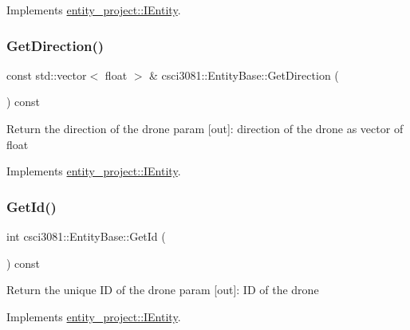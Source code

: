 Implements \hyperlink{classentity__project_1_1IEntity_a73c5b6deac9e2659160d2952ae7572c4}{entity\+\_\+project\+::\+I\+Entity}.

\mbox{\label{classcsci3081_1_1EntityBase_aeffff43e1d9b696b0ea3de83f7bee37d}} 
\subsubsection{\texorpdfstring{Get\+Direction()}{GetDirection()}}
{\footnotesize\ttfamily const std\+::vector$<$ float $>$ \& csci3081\+::\+Entity\+Base\+::\+Get\+Direction (\begin{DoxyParamCaption}{ }\end{DoxyParamCaption}) const\hspace{0.3cm}{\ttfamily [virtual]}}

Return the direction of the drone param \mbox{[}out\mbox{]}\+: direction of the drone as vector of float 

Implements \hyperlink{classentity__project_1_1IEntity_a385dad034b5a86666df9fc979a3d1d1b}{entity\+\_\+project\+::\+I\+Entity}.

\mbox{\label{classcsci3081_1_1EntityBase_a2802163d8d20092d985e763ad91d26da}} 
\subsubsection{\texorpdfstring{Get\+Id()}{GetId()}}
{\footnotesize\ttfamily int csci3081\+::\+Entity\+Base\+::\+Get\+Id (\begin{DoxyParamCaption}{ }\end{DoxyParamCaption}) const\hspace{0.3cm}{\ttfamily [virtual]}}

Return the unique ID of the drone param \mbox{[}out\mbox{]}\+: ID of the drone 

Implements \hyperlink{classentity__project_1_1IEntity_a87f9d99f58cdc28b654ae9a6d82fbff6}{entity\+\_\+project\+::\+I\+Entity}.

\mbox{\label{classcsci3081_1_1EntityBase_ac18421e6e96eb3939e136a579c9ac6dd}} 

